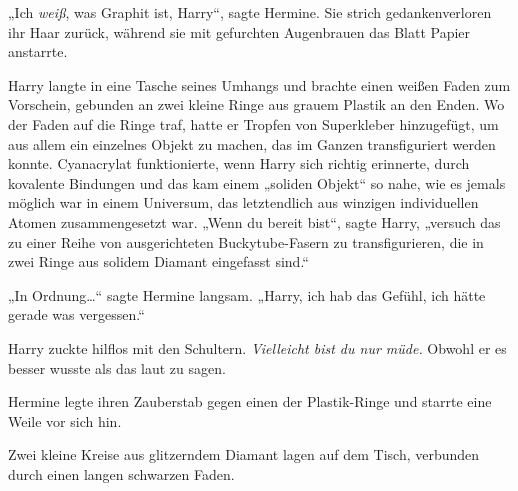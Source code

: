 „Ich \emph{weiß}, was Graphit ist, Harry“, sagte Hermine. Sie strich gedankenverloren ihr Haar zurück, während sie mit gefurchten Augenbrauen das Blatt Papier anstarrte.

Harry langte in eine Tasche seines Umhangs und brachte einen weißen Faden zum Vorschein, gebunden an zwei kleine Ringe aus grauem Plastik an den Enden. Wo der Faden auf die Ringe traf, hatte er Tropfen von Superkleber hinzugefügt, um aus allem ein einzelnes Objekt zu machen, das im Ganzen transfiguriert werden konnte. Cyanacrylat funktionierte, wenn Harry sich richtig erinnerte, durch kovalente Bindungen und das kam einem „soliden Objekt“ so nahe, wie es jemals möglich war in einem Universum, das letztendlich aus winzigen individuellen Atomen zusammengesetzt war. „Wenn du bereit bist“, sagte Harry, „versuch das zu einer Reihe von ausgerichteten Buckytube-Fasern zu transfigurieren, die in zwei Ringe aus solidem Diamant eingefasst sind.“

„In Ordnung…“ sagte Hermine langsam. „Harry, ich hab das Gefühl, ich hätte gerade was vergessen.“

Harry zuckte hilflos mit den Schultern. \emph{Vielleicht bist du nur müde.} Obwohl er es besser wusste als das laut zu sagen.

Hermine legte ihren Zauberstab gegen einen der Plastik-Ringe und starrte eine Weile vor sich hin.

Zwei kleine Kreise aus glitzerndem Diamant lagen auf dem Tisch, verbunden durch einen langen schwarzen Faden.

